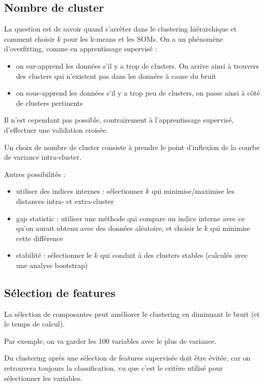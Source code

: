 		
	\subsection{Nombre de cluster}
	
	La question est de savoir quand s'arrêter dans le clustering hiérarchique et comment choisir $k$ pour les k-means et les SOMs. On a un phénomène d'overfitting, comme en apprentissage supervisé :
	
	\begin{itemize}
		\item on sur-apprend les données s'il y a trop de clusters. On arrive ainsi à trouvers des clusters qui n'existent pas dans les données à cause du bruit
		\item on sous-apprend les données s'il y a trop peu de clusters, on passe ainsi à côté de clusters pertinents
	\end{itemize}
	
	Il n'est cependant pas possible, contrairement à l'apprentissage supervisé, d'effectuer une validation croisée.
	
	Un choix de nombre de cluster consiste à prendre le point d'inflexion de la courbe de variance intra-cluster.
	
	
	
	Autres possibilités :
	
	\begin{itemize}
		\item utiliser des indices internes : sélectionner $k$ qui minimise/maximise les distances intra- et extra-cluster
		\item gap statistic : utiliser une méthode qui compare un indice interne avec ce qu'on aurait obtenu avec des données aléatoire, et choisir le $k$ qui minimise cette différence
		\item stabilité : sélectionner le $k$ qui conduit à des clusters stables (calculés avec une analyse bootstrap)
	\end{itemize}
	
	\subsection{Sélection de features}
	
	La sélection de composantes peut améliorer le clustering en diminuant le bruit (et le temps de calcul).
	
	Par exemple, on va garder les 100 variables avec le plus de variance.
	
	Du clustering après une sélection de features supervisée doit être évitée, car on retrouvera toujours la classification, vu que c'est le critère utilisé pour sélectionner les variables.
	
